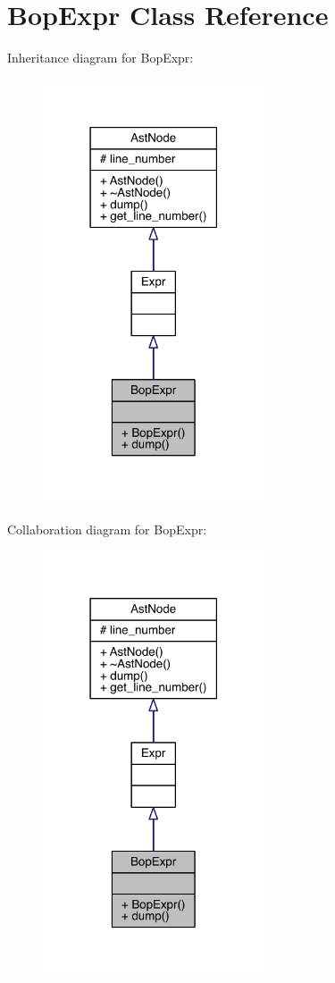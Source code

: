 \hypertarget{class_bop_expr}{}\section{Bop\+Expr Class Reference}
\label{class_bop_expr}


Inheritance diagram for Bop\+Expr\+:\nopagebreak
\begin{figure}[H]
\begin{center}
\leavevmode
\includegraphics[width=186pt]{class_bop_expr__inherit__graph}
\end{center}
\end{figure}


Collaboration diagram for Bop\+Expr\+:\nopagebreak
\begin{figure}[H]
\begin{center}
\leavevmode
\includegraphics[width=186pt]{class_bop_expr__coll__graph}
\end{center}
\end{figure}
